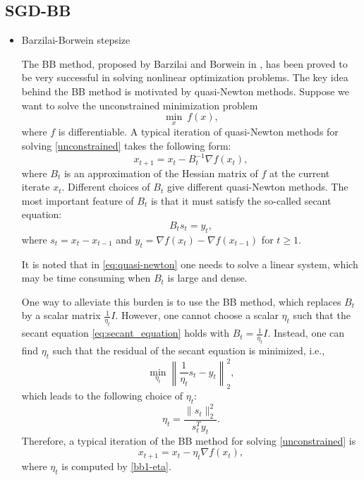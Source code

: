 \documentclass[conference,onecolumn,12pt]{IEEEtran}
\renewcommand{\(}{\left(}
\renewcommand{\)}{\right)}
\numberwithin{equation}{section}
\numberwithin{figure}{section}
\numberwithin{table}{section}
\theoremstyle{definition}
\begin{document}
\subsection{SGD-BB}
\begin{itemize}
  \item Barzilai-Borwein stepsize
  
  The BB method, proposed by Barzilai and Borwein in \cite{barzilai1988two}, has been proved to be very successful in solving nonlinear optimization problems. The key idea behind the BB method is motivated by quasi-Newton methods. Suppose we want to solve the unconstrained minimization problem
\begin{equation}\label{unconstrained}\min_x \ f(x),\end{equation}
where $f$ is differentiable. A typical iteration of quasi-Newton methods for solving \eqref{unconstrained} takes the following form:
\begin{equation}\label{eq:quasi-newton}
    x_{t+1} = x_t - B_t^{-1}\nabla f(x_t),
\end{equation}
where $B_t$ is an approximation of the Hessian matrix of $f$ at the current iterate $x_t$. Different choices of $B_t$ give different quasi-Newton methods. The most important feature of $B_t$ is that it must satisfy the so-called secant equation:
\begin{equation}\label{eq:secant_equation}
    B_t s_t=y_t,
\end{equation}
where $s_t=x_t-x_{t-1}$ and $y_t=\nabla f(x_t)-\nabla f(x_{t-1})$ for $t\geq 1$.

It is noted that in \eqref{eq:quasi-newton} one needs to solve a linear system, which may be time consuming when $B_t$ is large and dense.

One way to alleviate this burden is to use the BB method, which replaces $B_t$ by a scalar matrix $\frac{1}{\eta_t} I$. However, one cannot choose a scalar $\eta_t$ such that the secant equation \eqref{eq:secant_equation} holds with $B_t=\frac{1}{\eta_t} I$. Instead, one can find $\eta_t$ such that the residual of the secant equation is minimized, i.e.,
\[\min_{\eta_t} \left\| \frac{1}{\eta_t} s_t - y_t \right\|_2^2,\]
which leads to the following choice of $\eta_t$:
\begin{equation}\label{bb1-eta} \eta_t = \frac{\|s_t\|_2^2}{s_t^T y_t}. \end{equation}
Therefore, a typical iteration of the BB method for solving \eqref{unconstrained} is
\begin{equation}\label{bb-update} x_{t+1} = x_t - \eta_t\nabla f(x_t),\end{equation}
where $\eta_t$ is computed by \eqref{bb1-eta}.

\end{itemize}
\end{document}
